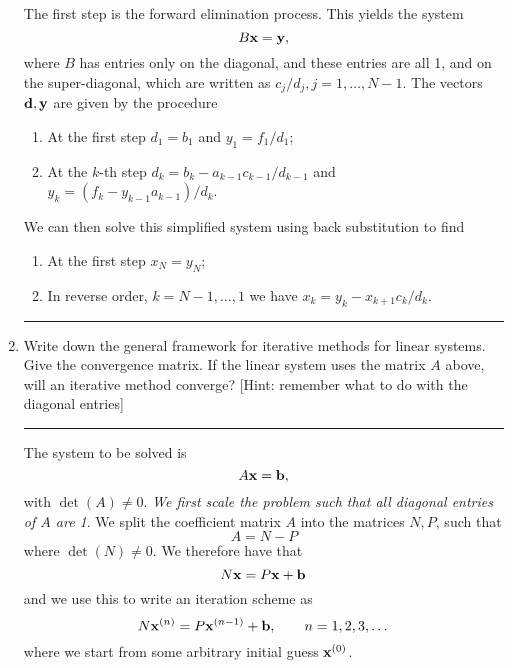 \documentclass[10pt]{article}
\begin{document}
\begin{enumerate}
  The first step is the forward elimination process. This yields the
  system 
  \begin{equation*}
    B {\bf x} = {\bf y},
  \end{equation*}
  where $B$ has entries only on the diagonal, and these entries are
  all 1, and on the super-diagonal, which are written as $c_j / d_j, j
  = 1, \dots, N-1$. The vectors ${\bf d}, {\bf y}$ are given by the
  procedure 
  \begin{enumerate}
  \item At the first step $d_1=b_1$ and $y_1=f_1/d_1$;
  \item At the $k$-th step $d_k=b_k-a_{k-1}c_{k-1}/d_{k-1}$ and
    $y_k=(f_k-y_{k-1} a_{k-1})/d_k$.
  \end{enumerate}
  We can then solve this simplified system using back substitution to find
  \begin{enumerate}
  \item At the first step $x_N = y_N$;
  \item In reverse order, $k = N-1, \dots, 1$ we have
    $x_{k}=y_{k}-x_{k+1} c_{k}/d_{k}$.
  \end{enumerate}
  \begin{center}
    \rule{0.9\textwidth}{.1pt}
  \end{center}
\item Write down the general framework for iterative methods for
  linear systems. Give the convergence matrix. If the linear system
  uses the matrix $A$ above, will an iterative method converge? [Hint:
  remember what to do with the diagonal entries]
  \begin{center}
    \rule{0.9\textwidth}{.1pt}
  \end{center}
  The system to be solved is
  \begin{equation*}
    A {\bf x} = {\bf b},
  \end{equation*}
  with $\det(A) \ne 0$. \emph{We first scale the problem such that all
    diagonal entries of $A$ are 1}. We split the coefficient matrix
  $A$ into the matrices $N, P$, such that
  \begin{equation*}
    A = N - P
  \end{equation*}
  where $\det(N) \ne 0$. We therefore have that
  \begin{equation*}
    N {\bf x} = P {\bf x} + {\bf b}
  \end{equation*}
  and we use this to write an iteration scheme as
  \begin{equation*}
    N {\bf x}^{(n)} = P {\bf x}^{(n-1)} + {\bf b}, \qquad n = 1, 2, 3,
    \dots
  \end{equation*}
  where we start from some arbitrary initial guess ${\bf x}^{(0)}$.


\end{enumerate}
\end{document}
